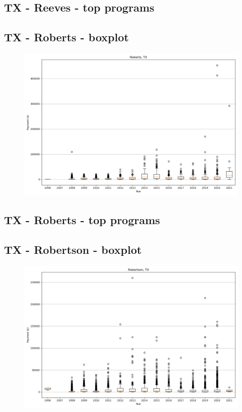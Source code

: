 \subsection*{TX - Reeves - top programs}

\newpage
\subsection*{TX - Roberts - boxplot}
\begin{figure}[h]
\centering
\includegraphics[width=7in]{../output/boxplots/counties/Roberts-TX_boxplot.png}
\end{figure}


\subsection*{TX - Roberts - top programs}

\newpage
\subsection*{TX - Robertson - boxplot}
\begin{figure}[h]
\centering
\includegraphics[width=7in]{../output/boxplots/counties/Robertson-TX_boxplot.png}
\end{figure}


